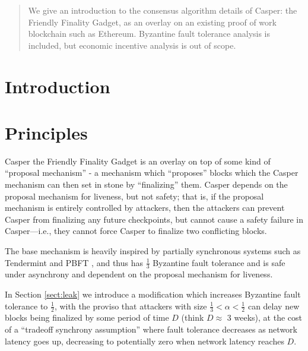\documentclass[12pt, final]{article}
\begin{document}
\maketitle
\TODO{ \today }

\begin{abstract}
We give an introduction to the consensus algorithm details of Casper: the Friendly Finality Gadget, as an overlay on an existing proof of work blockchain such as Ethereum. Byzantine fault tolerance analysis is included, but economic incentive analysis is out of scope. 
\end{abstract}

\section{Introduction}
\label{sect:intro}

\section{Principles}
Casper the Friendly Finality Gadget is an overlay on top of some kind of ``proposal mechanism'' - a mechanism which ``proposes'' blocks which the Casper mechanism can then set in stone by ``finalizing'' them.  Casper depends on the proposal mechanism for liveness, but not safety; that is, if the proposal mechanism is entirely controlled by attackers, then the attackers can prevent Casper from finalizing any future checkpoints, but cannot cause a safety failure in Casper---i.e., they cannot force Casper to finalize two conflicting blocks.

The base mechanism is heavily inspired by partially synchronous systems such as Tendermint \cite{kwon2014tendermint} and PBFT \cite{castro1999practical} , and thus has $\frac{1}{3}$ Byzantine fault tolerance and is safe under asynchrony and dependent on the proposal mechanism for liveness.

In Section \ref{sect:leak} we introduce a modification which increases Byzantine fault tolerance to $\frac{1}{2}$, with the proviso that attackers with size $\frac{1}{3} < \alpha < \frac{1}{2}$ can delay new blocks being finalized by some period of time $D$ (think $D \approx$ 3 weeks), at the cost of a ``tradeoff synchrony assumption'' where fault tolerance decreases as network latency goes up, decreasing to potentially zero when network latency reaches $D$.
\end{document}
